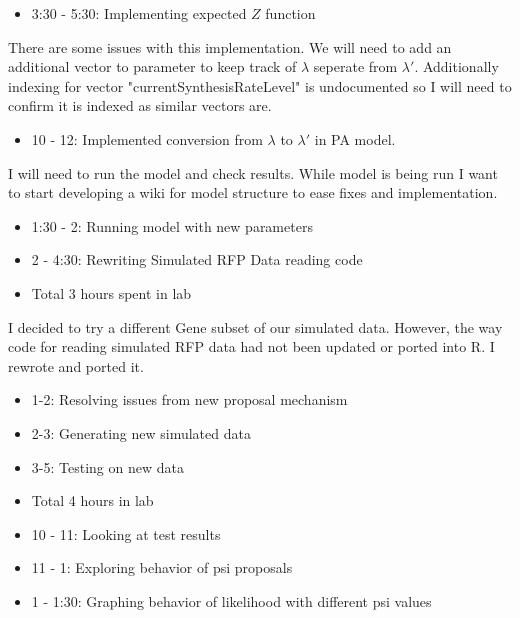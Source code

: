 \documentclass[12pt,hyperref]{labbook}
\begin{document}
\begin{itemize}
    \item 3:30 - 5:30: Implementing expected $Z$ function
\end{itemize}
There are some issues with this implementation. We will need to add an additional vector to parameter to keep track of $\lambda$ seperate
from $\lambda'$. Additionally indexing for vector "currentSynthesisRateLevel" is undocumented so I will need to confirm it is indexed as
similar vectors are.
\begin{itemize}
    \item 10 - 12: Implemented conversion from $\lambda$ to $\lambda'$ in PA model.
\end{itemize}
I will need to run the model and check results. While model is being run I want to start developing a wiki for model structure to ease fixes
and implementation. 
\begin{itemize}
    \item 1:30 - 2: Running model with new parameters
    \item 2 - 4:30: Rewriting Simulated RFP Data reading code
    \item Total 3 hours spent in lab
\end{itemize}
I decided to try a different Gene subset of our simulated data. However, the way code for reading simulated RFP data had not been updated or
ported into R. I rewrote and ported it.
\begin{itemize}
    \item 1-2: Resolving issues from new proposal mechanism
    \item 2-3: Generating new simulated data
    \item 3-5: Testing on new data
    \item Total 4 hours in lab
\end{itemize}
\begin{itemize}
    \item 10 - 11: Looking at test results
    \item 11 - 1: Exploring behavior of psi proposals
    \item 1 - 1:30: Graphing behavior of likelihood with different psi values
\end{itemize}
\end{document}
